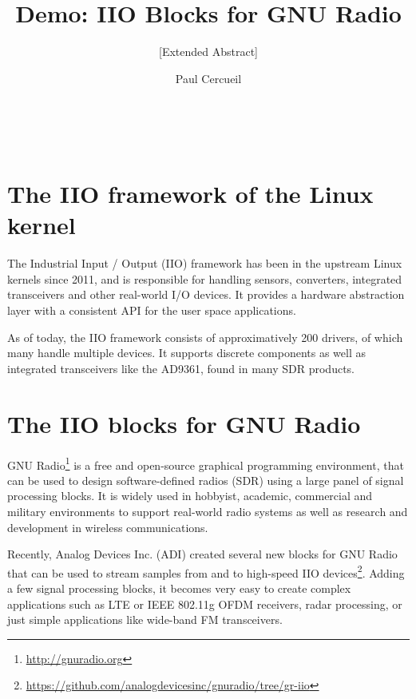 \documentclass{acm_proc_article-sp}
\begin{document}
\title{Demo: IIO Blocks for GNU Radio}
\subtitle{[Extended Abstract]}


\author{
\alignauthor
Paul Cercueil\\
	\\
	\\
	\\
}

\maketitle


\section{The IIO framework of the Linux kernel}

The Industrial Input / Output (IIO) framework has been in
the upstream Linux kernels since 2011, and is responsible for handling sensors,
converters, integrated transceivers and other real-world I/O devices. It provides
a hardware abstraction layer with a consistent API for the user space
applications.

As of today, the IIO framework consists of approximatively 200 drivers,
of which many handle multiple devices.
It supports discrete components as well as
integrated transceivers like the AD9361, found in many SDR products.

\section{The IIO blocks for GNU Radio}

GNU Radio\footnote{\url{http://gnuradio.org}}
is a free and open-source graphical programming environment, that can
be used to design software-defined radios (SDR) using a large panel of signal
processing blocks. It is widely used in hobbyist, academic, commercial and
military environments to support real-world radio systems as well as research
and development in wireless communications.

Recently, Analog Devices Inc. (ADI) created several new blocks for GNU Radio
that can be used to stream samples from and to high-speed IIO
devices\footnote{\url{https://github.com/analogdevicesinc/gnuradio/tree/gr-iio}}.
Adding a few signal processing
blocks, it becomes very easy to create complex applications such as
LTE or IEEE 802.11g OFDM receivers, radar processing, or just simple
applications like wide-band FM transceivers.
\end{document}
